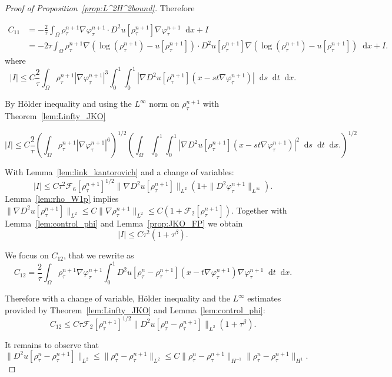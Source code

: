 \documentclass[a4paper,twosided, 11pt]{article}
\newcommand {\f}   {\frac}
\theoremstyle{plain}
\theoremstyle{remark}
\newcommand{\diff}{\mathop{}\!\mathrm{d}}
\numberwithin{equation}{section}
\begin{document}
\begin{proof}[Proof of Proposition~\ref{prop:L^2H^2bound}]
Therefore 

\begin{align*}
C_{11}& = -\f{2}{\tau}\int_{\Omega}\rho_{\tau}^{n+1}\nabla\varphi_{\tau}^{n+1}\cdot D^{2}u[\rho^{n+1}_{\tau}]\nabla\varphi^{n+1}_{\tau}\diff x + I\\
&= -2\tau\int_{\Omega}\rho_{\tau}^{n+1}\nabla(\log(\rho_{\tau}^{n+1}) - u[\rho_{\tau}^{n+1}])\cdot D^{2}u[\rho^{n+1}_{\tau}]\nabla(\log(\rho_{\tau}^{n+1}) - u[\rho_{\tau}^{n+1}])\diff x + I. 
\end{align*}
where 
$$
|I|\le C\f{2}{\tau}\int_{\Omega}\rho_{\tau}^{n+1}|\nabla\varphi_{\tau}^{n+1}|^3\int_{0}^{1}\int_{0}^{1}|\nabla D^{2} u[\rho_{\tau}^{n+1}](x-st\nabla\varphi_{\tau}^{n+1})|\diff s\diff t \diff x.
$$

By Hölder inequality and using the $L^{\infty}$ norm on $\rho_{\tau}^{n+1}$ with Theorem~\ref{lem:Linfty_JKO}

$$
|I|\le C\f{2}{\tau}\left(\int_{\Omega}\rho_{\tau}^{n+1}|\nabla\varphi_{\tau}^{n+1}|^6\right)^{1/2}\left(\int_{\Omega}\int_{0}^{1}\int_{0}^{1}|\nabla D^{2} u[\rho_{\tau}^{n+1}](x-st\nabla\varphi_{\tau}^{n+1})|^2\diff s\diff t \diff x.\right)^{1/2}
$$

With Lemma~\ref{lem:link_kantorovich} and a change of variables: 
$$
|I|\le C\tau^{2}\mathcal{F}_{6}[\rho_{\tau}^{n+1}]^{1/2}\|\nabla D^{2}u[\rho_{\tau}^{n+1}]\|_{L^{2}}(1+\|D^{2}\varphi_{\tau}^{n+1}\|_{L^{\infty}}).
$$
Lemma~\ref{lem:rho_W1p} implies $\|\nabla D^{2}u[\rho_{\tau}^{n+1}]\|_{L^{2}}\le C\|\nabla\rho_{\tau}^{n+1}\|_{L^{2}}\le C(1+\mathcal{F}_{2}[\rho_{\tau}^{n+1}]).$ Together with Lemma~\ref{lem:control_phi} and Lemma~\ref{prop:JKO_FP} we obtain 
$$
|I|\le C \tau^2(1+\tau^{\beta}). 
$$

We focus on $C_{12}$, that we rewrite as
$$
C_{12} = \f{2}{\tau}\int_{\Omega}\rho_{\tau}^{n+1}\nabla\varphi_{\tau}^{n+1}\int_{0}^{1}D^{2}u[\rho_{\tau}^{n}-\rho_{\tau}^{n+1}](x-t\nabla\varphi_{\tau}^{n+1})\nabla\varphi_{\tau}^{n+1}\diff t \diff x.
$$

Therefore with a change of variable, Hölder inequality and the $L^{\infty}$ estimates provided by Theorem~\ref{lem:Linfty_JKO} and Lemma~\ref{lem:control_phi}: 
$$
C_{12}\le C \tau \mathcal{F}_{2}[\rho_{\tau}^{n+1}]^{1/2}\|D^{2}u[\rho_{\tau}^{n}-\rho_{\tau}^{n+1}]\|_{L^{2}} (1 + \tau^{\beta}).
$$

It remains to observe that 
$$
\|D^{2}u[\rho_{\tau}^{n}-\rho_{\tau}^{n+1}]\|_{L^{2}} \le \|\rho_{\tau}^{n} - \rho_{\tau}^{n+1}\|_{L^{2}} \le C \|\rho_{\tau}^{n}-\rho_{\tau}^{n+1}\|_{H^{-1}}\|\rho_{\tau}^{n}-\rho_{\tau}^{n+1}\|_{H^{1}}.
$$


\end{proof}
\end{document}
